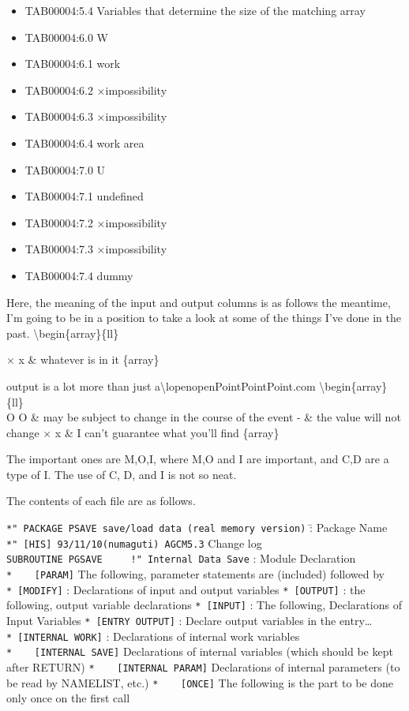 \begin{itemize}
  \begin{itemize}
  \tightlist
  \item
  \end{itemize}
\item
  TAB00004:5.4 Variables that determine the size of the matching array
\item
  TAB00004:6.0 W
\item
  TAB00004:6.1 work
\item
  TAB00004:6.2 ×impossibility
\item
  TAB00004:6.3 ×impossibility
\item
  TAB00004:6.4 work area
\item
  TAB00004:7.0 U
\item
  TAB00004:7.1 undefined
\item
  TAB00004:7.2 ×impossibility
\item
  TAB00004:7.3 ×impossibility
\item
  TAB00004:7.4 dummy
\end{itemize}

Here, the meaning of the input and output columns is as follows \In the
meantime, I'm going to be in a position to take a look at some of the
things I've done in the past. \textbackslash begin\{array\}\{ll\}

× x \& whatever is in it \{array\}

\The output is a lot more than just
a\textbackslash lopenopenPointPointPoint.com
\textbackslash begin\{array\}\{ll\}\\
O O \& may be subject to change in the course of the event - \& the
value will not change × x \& I can't guarantee what you'll find
\{array\}

The important ones are M,O,I, where M,O and I are important, and C,D are
a type of I. The use of C, D, and I is not so neat.

The contents of each file are as follows.

\texttt{*"\ PACKAGE\ PSAVE\ save/load\ data\ (real\ memory\ version)} :̄
Package Name \texttt{*"\ {[}HIS{]}\ 93/11/10(numaguti)\ AGCM5.3} Change
log \texttt{SUBROUTINE\ PGSAVE\ \ \ \ \ !"\ Internal\ Data\ Save} :
Module Declaration \texttt{*\ \ \ \ {[}PARAM{]}} The following,
parameter statements are (included) followed by \texttt{*\ {[}MODIFY{]}}
: Declarations of input and output variables \texttt{*\ {[}OUTPUT{]}} :
the following, output variable declarations \texttt{*\ {[}INPUT{]}} :
The following, Declarations of Input Variables
\texttt{*\ {[}ENTRY\ OUTPUT{]}} : Declare output variables in the
entry\ldots{} \texttt{*\ {[}INTERNAL\ WORK{]}} : Declarations of
internal work variables \texttt{*\ \ \ \ {[}INTERNAL\ SAVE{]}}
Declarations of internal variables (which should be kept after RETURN)
\texttt{*\ \ \ \ {[}INTERNAL\ PARAM{]}} Declarations of internal
parameters (to be read by NAMELIST, etc.) \texttt{*\ \ \ \ {[}ONCE{]}}
The following is the part to be done only once on the first call

